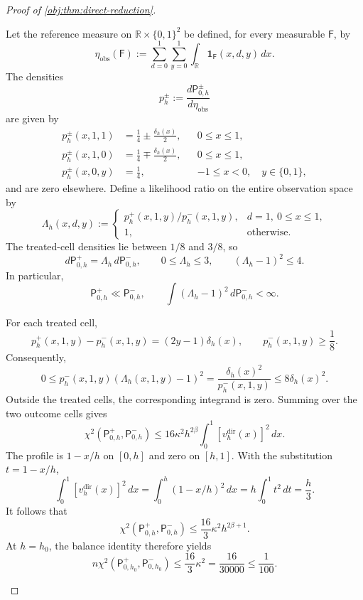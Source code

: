 \documentclass[11pt]{article}
\begin{document}
\begin{proof}[Proof of \cref{obj:thm:direct-reduction}]
\begin{enumerate}
Let the reference measure on \(\mathbb R\times\{0,1\}^2\) be defined, for every measurable \(\mathsf F\), by
\[
\eta_{\mathrm{obs}}(\mathsf F)
:=\sum_{d=0}^1\sum_{y=0}^1
\int_{\mathbb R}\mathbf1_{\mathsf F}(x,d,y)\,dx.
\]
The densities
\[
p_h^\pm:=\frac{d\mathsf P_{0,h}^\pm}{d\eta_{\mathrm{obs}}}
\]
are given by
\[
\begin{aligned}
p_h^\pm(x,1,1)&=\frac14\pm\frac{\delta_h(x)}2,
&&0\le x\le1,\\
p_h^\pm(x,1,0)&=\frac14\mp\frac{\delta_h(x)}2,
&&0\le x\le1,\\
p_h^\pm(x,0,y)&=\frac14,
&&-1\le x<0,\quad y\in\{0,1\},
\end{aligned}
\]
and are zero elsewhere. Define a likelihood ratio on the entire observation space by
\[
\Lambda_h(x,d,y):=
\begin{cases}
p_h^+(x,1,y)/p_h^-(x,1,y),
&d=1,\ 0\le x\le1,\\
1,&\text{otherwise}.
\end{cases}
\]
The treated-cell densities lie between \(1/8\) and \(3/8\), so
\[
d\mathsf P_{0,h}^+
=\Lambda_h\,d\mathsf P_{0,h}^-,
\qquad
0\le\Lambda_h\le3,
\qquad
(\Lambda_h-1)^2\le4.
\]
In particular,
\[
\mathsf P_{0,h}^+\ll\mathsf P_{0,h}^-,
\qquad
\int(\Lambda_h-1)^2\,d\mathsf P_{0,h}^-<\infty.
\]

For each treated cell,
\[
p_h^+(x,1,y)-p_h^-(x,1,y)
=(2y-1)\delta_h(x),
\qquad
p_h^-(x,1,y)\ge\frac18.
\]
Consequently,
\[
0\le
p_h^-(x,1,y)(\Lambda_h(x,1,y)-1)^2
=\frac{\delta_h(x)^2}{p_h^-(x,1,y)}
\le8\delta_h(x)^2.
\]
Outside the treated cells, the corresponding integrand is zero. Summing over the two outcome cells gives
\[
\chi^2(\mathsf P_{0,h}^+,\mathsf P_{0,h}^-)
\le16\kappa^2h^{2\beta}
\int_0^1[v_h^{\mathrm{dir}}(x)]^2\,dx.
\]
The profile is \(1-x/h\) on \([0,h]\) and zero on \([h,1]\). With the substitution \(t=1-x/h\),
\[
\int_0^1[v_h^{\mathrm{dir}}(x)]^2\,dx
=\int_0^h(1-x/h)^2\,dx
=h\int_0^1t^2\,dt
=\frac h3.
\]
It follows that
\[
\chi^2(\mathsf P_{0,h}^+,\mathsf P_{0,h}^-)
\le\frac{16}{3}\kappa^2h^{2\beta+1}.
\]
At \(h=h_0\), the balance identity therefore yields
\[
n\chi^2(\mathsf P_{0,h_0}^+,\mathsf P_{0,h_0}^-)
\le\frac{16}{3}\kappa^2
=\frac{16}{30000}
\le\frac1{100}.
\]


\end{enumerate}
\end{proof}
\end{document}
